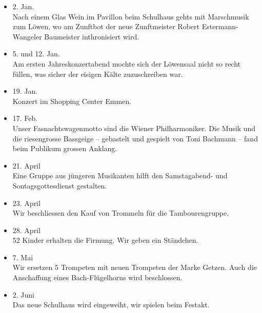 \begin{history}


    \begin{itemize}

        \item[]2. Jan.\\
        Nach einem Glas Wein im Pavillon beim Schulhaus gehts mit Marschmusik
        zum Löwen, wo am Zunftbot der neue Zunftmeister Robert
        Estermann-Wangeler Baumeister inthronisiert wird.

        \item[]5. und 12. Jan.\\
        Am ersten Jahreskonzertabend mochte sich der Löwensaal nicht so recht
        füllen, was sicher der eisigen Kälte zuzuschreiben war.

        \item[]19. Jan.\\
        Konzert im Shopping Center Emmen.

        \item[]17. Feb.\\
        Unser Fasnachtswagenmotto sind die Wiener Philharmoniker. Die Musik und
        die riesengrosse Bassgeige -- gebastelt und gespielt von Toni Bachmann
        -- fand beim Publikum grossen Anklang.

        \item[]21. April\\
        Eine Gruppe aus jüngeren Musikanten hilft den Samstagabend- und
        Sontagsgottesdienst gestalten.

        \item[]23. April\\
        Wir beschliessen den Kauf von Trommeln für die Tambourengruppe.

        \item[]28. April\\
        52 Kinder erhalten die Firmung. Wir geben ein Ständchen.

        \item[]7. Mai\\
        Wir ersetzen 5 Trompeten mit neuen Trompeten der Marke Getzen. Auch die
        Anschaffung eines Bach-Flügelhorns wird beschlossen.

        \item[]2. Juni\\
        Das neue Schulhaus wird eingeweiht, wir spielen beim Festakt.


\end{itemize}
\end{history}
